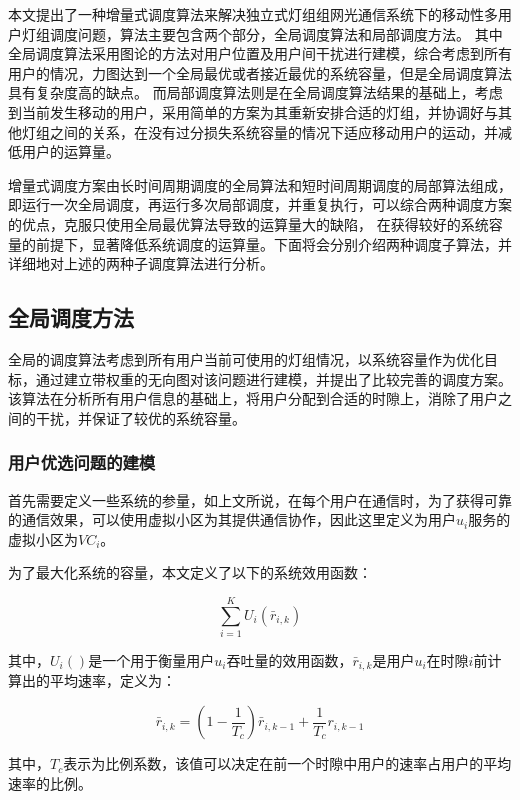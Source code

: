 本文提出了一种增量式调度算法来解决独立式灯组组网光通信系统下的移动性多用户灯组调度问题，算法主要包含两个部分，全局调度算法和局部调度方法。
其中全局调度算法采用图论的方法对用户位置及用户间干扰进行建模，综合考虑到所有用户的情况，力图达到一个全局最优或者接近最优的系统容量，但是全局调度算法具有复杂度高的缺点。
而局部调度算法则是在全局调度算法结果的基础上，考虑到当前发生移动的用户，采用简单的方案为其重新安排合适的灯组，并协调好与其他灯组之间的关系，在没有过分损失系统容量的情况下适应移动用户的运动，并减低用户的运算量。

增量式调度方案由长时间周期调度的全局算法和短时间周期调度的局部算法组成，即运行一次全局调度，再运行多次局部调度，并重复执行，可以综合两种调度方案的优点，克服只使用全局最优算法导致的运算量大的缺陷，
在获得较好的系统容量的前提下，显著降低系统调度的运算量。下面将会分别介绍两种调度子算法，并详细地对上述的两种子调度算法进行分析。

\subsection{全局调度方法}
全局的调度算法考虑到所有用户当前可使用的灯组情况，以系统容量作为优化目标，通过建立带权重的无向图对该问题进行建模，并提出了比较完善的调度方案。
该算法在分析所有用户信息的基础上，将用户分配到合适的时隙上，消除了用户之间的干扰，并保证了较优的系统容量。

\subsubsection{用户优选问题的建模}
首先需要定义一些系统的参量，如上文所说，在每个用户在通信时，为了获得可靠的通信效果，可以使用虚拟小区为其提供通信协作，因此这里定义为用户$u_{i}$服务的虚拟小区为$VC_{i}$。

为了最大化系统的容量，本文定义了以下的系统效用函数：

\begin{equation}
    \sum\limits_{i = 1}^K {{U_i}({{\bar r}_{i,k}})}
\end{equation}

其中，$U_i()$是一个用于衡量用户$u_{i}$吞吐量的效用函数，${\bar r}_{i,k}$是用户$u_{i}$在时隙$i$前计算出的平均速率，定义为：

\begin{equation}
    {\bar r_{i,k}} = (1 - \frac{1}{{{T_c}}}){\bar r_{i,k - 1}} + \frac{1}{{{T_c}}}{r_{i,k - 1}}
\end{equation}

其中，$T_{c}$表示为比例系数，该值可以决定在前一个时隙中用户的速率占用户的平均速率的比例。

